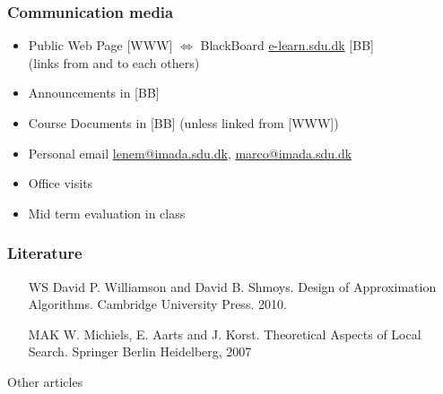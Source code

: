 \documentclass[handout,usepdftitle=false,aspectratio=169,smaller,compress,sans,fleqn,xcolor=dvipsnames,fleqn,table]{beamer}
\begin{document}





  \begin{frame}%
    \frametitle{Communication media}
    \medskip\begin{itemize}\itemsep=3ex
    
\item Public Web Page [WWW] $\Leftrightarrow$ BlackBoard \url{e-learn.sdu.dk} [BB]\\
 (links from and to each others)
\item \alert{Announcements} in [BB]
\item \alert{Course Documents} in [BB] (unless linked from [WWW]) 
\item Personal email \url{lenem@imada.sdu.dk}, \url{marco@imada.sdu.dk}
\item Office visits

\item \alert{Mid term evaluation} in class
\end{itemize}

\end{frame}


\begin{frame}%
  \frametitle{Literature}

\begin{itemize}
\itemsep=3ex
\item[WS] David P. Williamson and David B. Shmoys. Design of Approximation Algorithms. Cambridge University Press. 2010.

  \item[MAK] W. Michiels, E. Aarts and J. Korst. \alert{Theoretical Aspects of
    Local Search}. Springer Berlin Heidelberg, 2007
\end{itemize}

\bigskip

Other articles
\end{frame}
\end{document}
